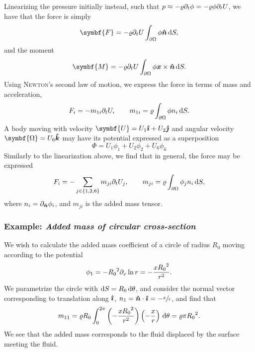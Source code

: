 Linearizing the pressure initially instead, such that $p \approx -\varrho \partial_t\phi = -\varrho\phi\partial_t U$, we have that the force is simply
\[
    \symbf{F} = -\varrho \deet U \int_{\partial\Omega} \phi\nhat \,\dee S,
\]
and the moment
\[
    \symbf{M} = -\varrho \deet U \int_{\partial\Omega} \phi \xvec\times\nhat \,\dee S.
\]
Using \textsc{Newton}'s second law of motion, we express the force in terms of mass and acceleration,
\[
    F_i = -m_{1i} \partial_t U, \qquad m_{1i} = \varrho\int_{\partial\Omega} \phi n_i \,\mathrm{d} S.
\]
A body moving with velocity $\symbf{U} = U_1 \ihat + U_2 \jhat$ and angular velocity $\symbf{\Omega} = U_6 \khat$ may have its potential expressed as a superposition
\[
    \Phi = U_1 \phi_1 + U_2 \phi_2 + U_6 \phi_6
\]
Similarly to the linearization above, we find that in general, the force may be expressed
\[
    F_i = -\sum_{j \in \{1,2,6\}} m_{ji} \partial_t U_j, \qquad m_{ji} = \varrho \int_{\partial\Omega} \phi_j n_i \,\mathrm{d} S,
\]
where $n_i = \partial_{\bm{\hat{n}}} \phi_i$, and $m_{ji}$ is the added mass tensor.

\subsubsection*{Example: \emph{Added mass of circular cross-section}}
We wish to calculate the added mass coefficient of a circle of radius $R_0$ moving according to the potential
\[
    \phi_1 = -{R_0}^2 \partial_x\ln{r} = -\frac{x{R_0}^2}{r^2}.
\]
We parametrize the circle with $\mathrm{d} S = R_0 \,\mathrm{d}\theta$, and consider the normal vector corresponding to translation along $\bm{\hat{\imath}}$, $n_1 = \bm{\hat{n}}\cdot\bm{\hat{\imath}} = -\sfrac{x}{r}$, and find that
\[
    m_{11} = \varrho R_0 \int_{0}^{2\pi} \left( -\frac{x {R_0}^2}{r^2} \right) \left( -\frac{x}{r} \right) \,\mathrm{d}\theta = \varrho \pi {R_0}^2.
\]
We see that the added mass corresponds to the fluid displaced by the surface meeting the fluid.